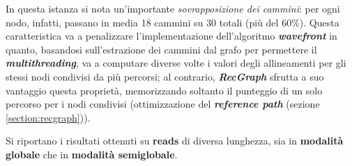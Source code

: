     In questa istanza si nota un'importante \emph{sovrapposizione dei cammini}: per ogni nodo, infatti, passano in media 18 cammini su 30 totali (più del 60\%). Questa caratteristica va a penalizzare l'implementazione dell'algoritmo \textbf{\textit{wavefront}} in quanto, basandosi sull'estrazione dei cammini dal grafo per permettere il \textbf{\textit{multithreading}}, va a computare diverse volte i valori degli allineamenti per gli stessi nodi condivisi da più percorsi; al contrario, \textbf{\textit{RecGraph}} sfrutta a suo vantaggio questa proprietà, memorizzando soltanto il punteggio di un solo percorso per i nodi condivisi (ottimizzazione del \textbf{\textit{reference path}} (sezione \ref{section:recgraph})).   

    \vspace{20pt}
    Si riportano i risultati ottenuti su \textbf{reads} di diversa lunghezza, sia in \textbf{modalità globale} che in \textbf{modalità semiglobale}.

